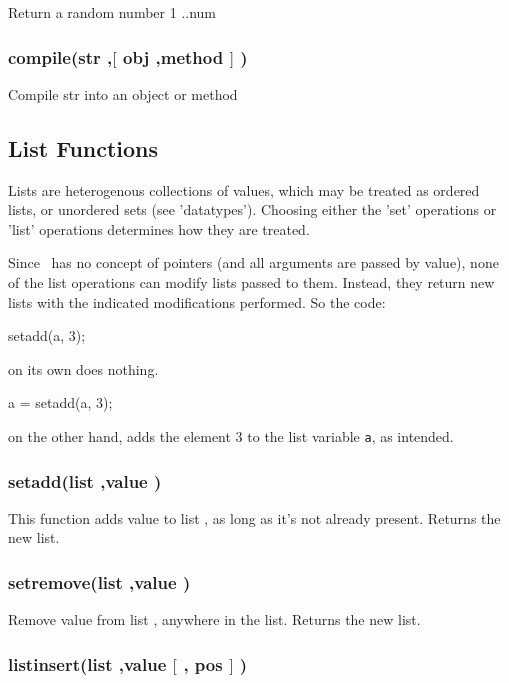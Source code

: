 Return a random number 1 ..{\funcarg num }

\subsubsection{\func compile({\funcarg str },{\funcarg $[$ obj },{\funcarg method $]$ })}

Compile {\funcarg str } into an object or method

\subsection{List Functions}

Lists are heterogenous collections of values, which may be treated
as ordered lists, or unordered sets (see 'datatypes').  Choosing
either the 'set' operations or 'list' operations determines how
they are treated.

Since \COOL\ has no concept of pointers (and all arguments are passed
by value), none of the list operations can modify lists passed to
them.  Instead, they return new lists with the indicated modifications
performed.  So the code:
\begin{code}
	setadd(a, 3);
\end{code}
on its own does nothing.
\begin{code}
	a = setadd(a, 3);
\end{code}
on the other hand, adds the element 3 to the list variable {\tt a}, as
intended.

\subsubsection{\func setadd({\funcarg list },{\funcarg value })}

This function adds {\funcarg value } to {\funcarg list }, as long as it's
not already present.  Returns the new list.

\subsubsection{\func setremove({\funcarg list },{\funcarg value })}

Remove {\funcarg value } from {\funcarg list }, anywhere in the list. 
Returns the new list.  

\subsubsection{\func listinsert({\funcarg list },{\funcarg value $[$ }, {\funcarg pos $]$ })}

